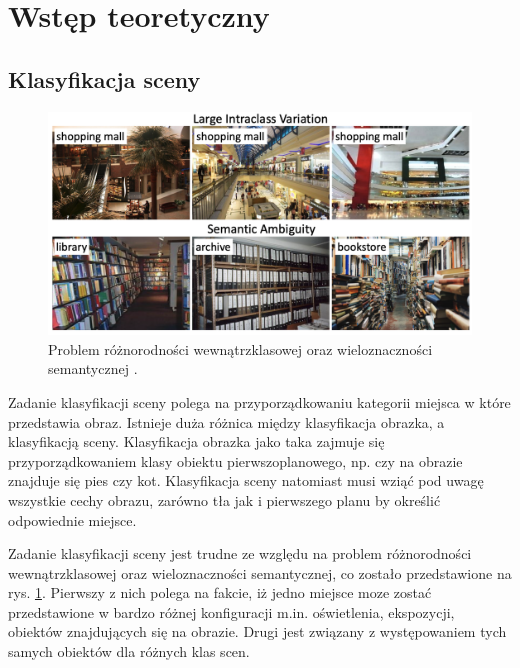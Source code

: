 \section{Wstęp teoretyczny}
\subsection{Klasyfikacja sceny}
\begin{figure}
    \includegraphics[width=\textwidth]{images/scene_class.png}
    \caption{Problem różnorodności wewnątrzklasowej oraz wieloznaczności semantycznej \cite{zeng2021deep}.}
    \label{fig:scene-class}
\end{figure}

Zadanie klasyfikacji sceny polega na przyporządkowaniu kategorii miejsca w które przedstawia obraz. Istnieje duża różnica między klasyfikacja obrazka, a klasyfikacją sceny. Klasyfikacja obrazka jako taka zajmuje się przyporządkowaniem klasy obiektu pierwszoplanowego, np. czy na obrazie znajduje się pies czy kot. Klasyfikacja sceny natomiast musi wziąć pod uwagę wszystkie cechy obrazu, zarówno tła jak i pierwszego planu by określić odpowiednie miejsce.

Zadanie klasyfikacji sceny jest trudne ze względu na problem różnorodności wewnątrzklasowej oraz wieloznaczności semantycznej, co zostało przedstawione na rys. \ref{fig:scene-class}. Pierwszy z nich polega na fakcie, iż jedno miejsce moze zostać przedstawione w bardzo różnej konfiguracji m.in. oświetlenia, ekspozycji, obiektów znajdujących się na obrazie. Drugi jest związany z występowaniem tych samych obiektów dla różnych klas scen.

